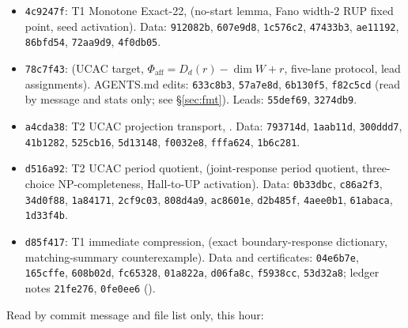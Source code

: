 \documentclass[11pt]{article}
\theoremstyle{definition}
\theoremstyle{remark}
\begin{document}
\begin{itemize}
\item \texttt{4c9247f}: T1 Monotone Exact-22,
(no-start lemma, Fano width-2 RUP fixed point, seed activation). Data:
\texttt{912082b}, \texttt{607e9d8}, \texttt{1c576c2}, \texttt{47433b3}, \texttt{ae11192},
\texttt{86bfd54}, \texttt{72aa9d9}, \texttt{4f0db05}.
\item \texttt{78c7f43}: 
(UCAC target, $\Phi_{\mathrm{aff}}=D_d(r)-\dim W+r$, five-lane protocol, lead assignments).
AGENTS.md edits: \texttt{633c8b3}, \texttt{57a7e8d}, \texttt{6b130f5}, \texttt{f82c5cd}
(read by message and stats only; see \S\ref{sec:fmt}). Leads: \texttt{55def69},
\texttt{3274db9}.
\item \texttt{a4cda38}: T2 UCAC projection transport,
. Data:
\texttt{793714d}, \texttt{1aab11d}, \texttt{300ddd7}, \texttt{41b1282}, \texttt{525cb16},
\texttt{5d13148}, \texttt{f0032e8}, \texttt{fffa624}, \texttt{1b6c281}.
\item \texttt{d516a92}: T2 UCAC period quotient,
 (joint-response
period quotient, three-choice NP-completeness, Hall-to-UP activation). Data:
\texttt{0b33dbc}, \texttt{c86a2f3}, \texttt{34d0f88}, \texttt{1a84171}, \texttt{2cf9c03},
\texttt{808d4a9}, \texttt{ac8601e}, \texttt{d2b485f}, \texttt{4aee0b1}, \texttt{61abaca},
\texttt{1d33f4b}.
\item \texttt{d85f417}: T1 immediate compression,
(exact boundary-response dictionary, matching-summary counterexample). Data and
certificates: \texttt{04e6b7e}, \texttt{165cffe}, \texttt{608b02d}, \texttt{fc65328},
\texttt{01a822a}, \texttt{d06fa8c}, \texttt{f5938cc}, \texttt{53d32a8}; ledger notes
\texttt{21fe276}, \texttt{0fe0ee6} ().
\end{itemize}
Read by commit message and file list only, this hour:
\end{document}
